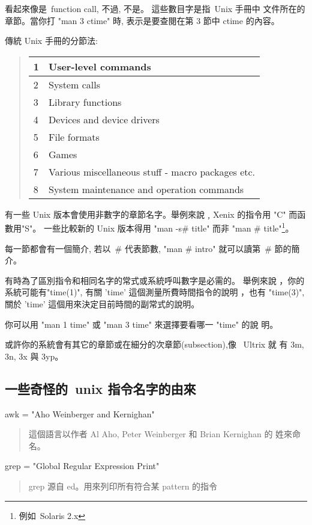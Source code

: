 \documentclass{article}
\begin{document}
\begin{CJK*}{Bg5}{ming}
	看起來像是~function call, 不過, 不是。 這些數目字是指~Unix 手冊中
	文件所在的章節。當你打 "man 3 ctime" 時, 表示是要查閱在第 3 節中 
	ctime 的內容。

	傳統 Unix 手冊的分節法:
	\begin{quote}
	\begin{tabular}{|l|l|}
	\hline
	        1   &   User-level  commands \\
	\hline
	        2   &   System calls \\
	\hline
	        3   &   Library functions  \\
	\hline
	        4   &   Devices and device drivers \\
	\hline
	        5   &   File formats \\
	\hline
	        6   &   Games \\
	\hline
	        7   &   Various miscellaneous stuff -  macro packages etc. \\
	\hline
	        8   &   System maintenance and operation commands \\
	\hline
	\end{tabular}
	\end{quote}

	有一些 Unix 版本會使用非數字的章節名字。舉例來說﹐Xenix 的指令用
	"C" 而函數用"S"。 一些比較新的 Unix 版本得用 "man -s\# title" 而非 
	"man \# title"\footnote{例如~Solaris 2.x}。 
	
	每一節都會有一個簡介, 若以~\# 代表節數, "man \# intro" 就可以讀第~\# 
	節的簡介。

	有時為了區別指令和相同名字的常式或系統呼叫數字是必需的。 舉例來說
	，你的系統可能有"time(1)", 有關 'time' 這個測量所費時間指令的說明
	，也有 "time(3)", 關於 'time' 這個用來決定目前時間的副常式的說明。 

	你可以用  "man 1 time" 或 "man 3 time" 來選擇要看哪一 "time" 的說
	明。

	或許你的系統會有其它的章節或在細分的次章節(subsection),像~ Ultrix 就
	有 3m, 3n, 3x 與 3yp。
 
\subsection{一些奇怪的~unix 指令名字的由來}
    awk = "Aho Weinberger and Kernighan"
    \begin{quote}
	這個語言以作者 Al Aho, Peter Weinberger 和 Brian Kernighan 的
	姓來命名。
    \end{quote}
    grep = "Global Regular Expression Print"
    \begin{quote}
	grep 源自 ed。用來列印所有符合某 pattern 的指令


\end{quote}
\end{CJK*}
\end{document}
